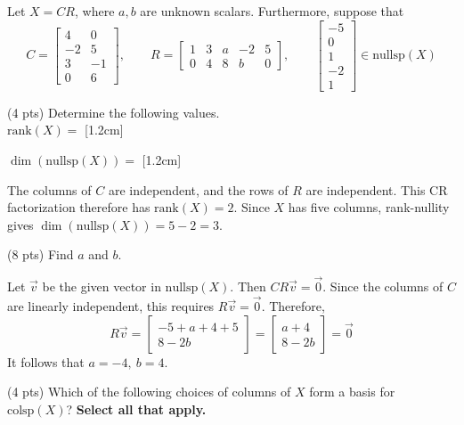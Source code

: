 \documentclass[11pt]{article}
\begin{document}
\begin{prob}[(16 pts)]
Let $X=CR$, where $a,b$ are unknown scalars. Furthermore, suppose that
\[
C=\begin{bmatrix}4&0\\-2&5\\3&-1\\0&6\end{bmatrix},\qquad
R=\begin{bmatrix}1&3&a&-2&5\\0&4&8&b&0\end{bmatrix},\qquad
\begin{bmatrix}-5\\0\\1\\-2\\1\end{bmatrix}\in\text{nullsp}(X)
\]
\begin{subprob}(4 pts)
Determine the following values. \\

$\text{rank}(X)=$ [1.2cm]

$\dim(\text{nullsp}(X))=$ [1.2cm]

\begin{solution}
The columns of $C$ are independent, and the rows of $R$ are independent. This CR factorization therefore has $\text{rank}(X)=2$. Since $X$ has five columns, rank-nullity gives $\dim(\text{nullsp}(X))=5-2=3$.
\end{solution}
\end{subprob}
\begin{subprob}(8 pts)
Find $a$ and $b$. \\

\begin{solution}
Let $\vec v$ be the given vector in $\text{nullsp}(X)$. Then $CR\vec v=\vec0$. Since the columns of $C$ are linearly independent, this requires $R\vec v=\vec0$. Therefore,
\[
R\vec v=\begin{bmatrix}-5+a+4+5\\8-2b\end{bmatrix}
=\begin{bmatrix}a+4\\8-2b\end{bmatrix}=\vec0
\]
It follows that $\boxed{a=-4,\ b=4}$.
\end{solution}
\end{subprob}
\begin{subprob}(4 pts)
Which of the following choices of columns of $X$ form a basis for $\text{colsp}(X)$? \textbf{Select all that apply.} \\


\end{subprob}
\end{prob}
\end{document}
